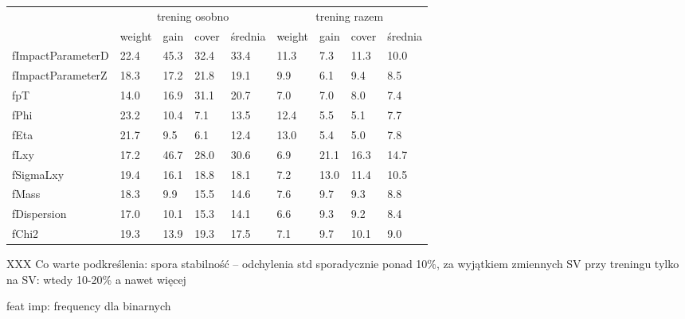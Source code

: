 \begin{tabular}{l|llll|llll}
\toprule
{} & \multicolumn{4}{c|}{trening osobno} & \multicolumn{4}{|c}{trening razem} \\
{} & weight & gain & cover & średnia & weight &   gain &  cover & średnia \\
\midrule
fImpactParameterD &     22.4 &   45.3 &    32.4 &       33.4 &   11.3 &  7.3 &  11.3 &     10.0 \\
fImpactParameterZ &     18.3 &   17.2 &    21.8 &       19.1 &    9.9 &  6.1 &   9.4 &      8.5 \\
fpT               &     14.0 &   16.9 &    31.1 &       20.7 &    7.0 &  7.0 &   8.0 &      7.4 \\
fPhi              &     23.2 &   10.4 &     7.1 &       13.5 &   12.4 &  5.5 &   5.1 &      7.7 \\
fEta              &     21.7 &    9.5 &     6.1 &       12.4 &   13.0 &  5.4 &   5.0 &      7.8 \\
\cline{1-5}
fLxy              &     17.2 &   46.7 &    28.0 &       30.6 &    6.9 & 21.1 &  16.3 &     14.7 \\
fSigmaLxy         &     19.4 &   16.1 &    18.8 &       18.1 &    7.2 & 13.0 &  11.4 &     10.5 \\
fMass             &     18.3 &    9.9 &    15.5 &       14.6 &    7.6 &  9.7 &   9.3 &      8.8 \\
fDispersion       &     17.0 &   10.1 &    15.3 &       14.1 &    6.6 &  9.3 &   9.2 &      8.4 \\
fChi2             &     19.3 &   13.9 &    19.3 &       17.5 &    7.1 &  9.7 &  10.1 &      9.0 \\
\bottomrule
\end{tabular}






XXX Co warte podkreślenia: spora stabilność -- odchylenia std sporadycznie ponad 10\%, za wyjątkiem zmiennych SV przy treningu tylko na SV: wtedy 10-20\% a nawet więcej

feat imp: frequency dla binarnych

%

